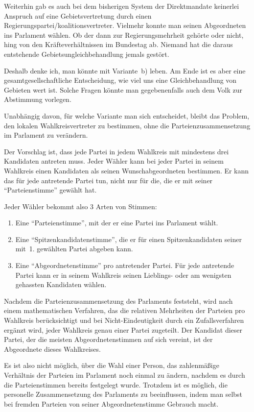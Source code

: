 Weiterhin gab es auch bei dem bisherigen System der Direktmandate keinerlei Anspruch auf
eine Gebietsvertretung durch einen Regierungspartei/koalitionsvertreter. Vielmehr konnte man
seinen Abgeordneten ins Parlament wählen. Ob der dann zur Regierungsmehrheit gehörte oder nicht,
hing von den Kräfteverhältnissen im Bundestag ab. Niemand hat die daraus entstehende
Gebietsungleichbehandlung jemals gestört.

Deshalb denke ich, man könnte mit Variante~b) leben.
Am Ende ist es aber eine gesamtgesellschaftliche Entscheidung, wie viel uns eine Gleichbehandlung
von Gebieten wert ist. Solche Fragen könnte man gegebenenfalls auch dem Volk zur Abstimmung
vorlegen.

Unabhängig davon, für welche Variante man sich entscheidet, bleibt das Problem, den lokalen
Wahlkreisvertreter zu bestimmen, ohne die Parteienzusammensetzung im Parlament zu verändern.

Der
Vorschlag ist, dass jede Partei in jedem Wahlkreis mit mindestens drei Kandidaten antreten muss.
Jeder Wähler kann bei jeder Partei in seinem Wahlkreis einen Kandidaten als seinen
Wunschabgeordneten bestimmen. Er kann das für jede antretende Partei tun, nicht nur für die, die
er mit seiner \enquote{Parteienstimme} gewählt hat.

Jeder Wähler bekommt also 3 Arten von
Stimmen:
\begin{enumerate}
  \item Eine \enquote{Parteienstimme}, mit der er eine Partei ins Parlament wählt.
  \item Eine \enquote{Spitzenkandidatenstimme}, die er für einen Spitzenkandidaten seiner mit~1.
    gewählten Partei abgeben kann.
  \item Eine \enquote{Abgeordnetenstimme} pro antretender Partei. Für jede antretende Partei kann
    er in seinem Wahlkreis seinen Lieblings- oder am wenigsten gehassten Kandidaten wählen.
\end{enumerate}
Nachdem die Parteienzusammensetzung des Parlaments feststeht, wird nach einem mathematischen
Verfahren, das die relativen Mehrheiten der Parteien pro Wahlkreis berücksichtigt und bei
Nicht-Eindeutigkeit durch ein Zufallsverfahren ergänzt wird, jeder Wahlkreis genau einer Partei
zugeteilt. Der Kandidat dieser Partei, der die meisten Abgeordnetenstimmen auf sich vereint, ist
der Abgeordnete dieses Wahlkreises.

Es ist also nicht möglich, über die Wahl einer Person, das
zahlenmäßige Verhältnis der Parteien im Parlament noch einmal zu ändern, nachdem es durch die
Parteienstimmen bereits festgelegt wurde.
Trotzdem ist es möglich, die personelle Zusammensetzung des Parlaments zu beeinflussen, indem man selbst bei fremden Parteien von seiner Abgeordnetenstimme Gebrauch macht.

